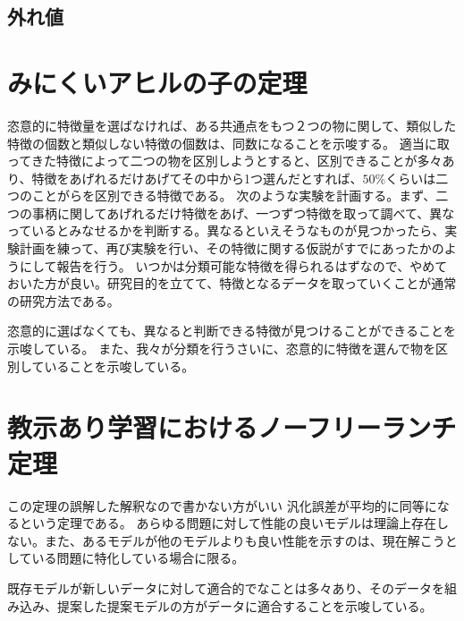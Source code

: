\subsection{外れ値}


\section{みにくいアヒルの子の定理}
恣意的に特徴量を選ばなければ、ある共通点をもつ２つの物に関して、類似した特徴の個数と類似しない特徴の個数は、同数になることを示唆する。
適当に取ってきた特徴によって二つの物を区別しようとすると、区別できることが多々あり、特徴をあげれるだけあげてその中から1つ選んだとすれば、$50\%$くらいは二つのことがらを区別できる特徴である。
次のような実験を計画する。まず、二つの事柄に関してあげれるだけ特徴をあげ、一つずつ特徴を取って調べて、異なっているとみなせるかを判断する。異なるといえそうなものが見つかったら、実験計画を練って、再び実験を行い、その特徴に関する仮説がすでにあったかのようにして報告を行う。
いつかは分類可能な特徴を得られるはずなので、やめておいた方が良い。研究目的を立てて、特徴となるデータを取っていくことが通常の研究方法である。

恣意的に選ばなくても、異なると判断できる特徴が見つけることができることを示唆している。
また、我々が分類を行うさいに、恣意的に特徴を選んで物を区別していることを示唆している。
\fi

\section{教示あり学習におけるノーフリーランチ定理}
この定理の誤解した解釈なので書かない方がいい
汎化誤差が平均的に同等になるという定理である。
あらゆる問題に対して性能の良いモデルは理論上存在しない。また、あるモデルが他のモデルよりも良い性能を示すのは、現在解こうとしている問題に特化している場合に限る。

既存モデルが新しいデータに対して適合的でなことは多々あり、そのデータを組み込み、提案した提案モデルの方がデータに適合することを示唆している。

\fi


